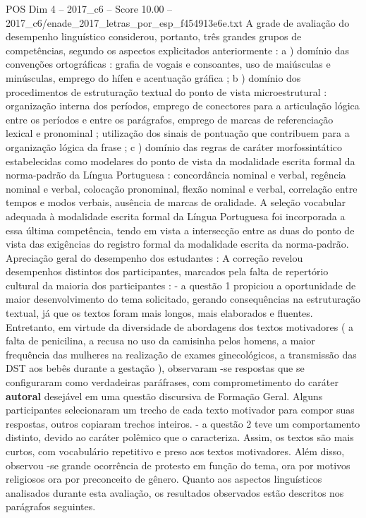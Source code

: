 \begin{textsample}{POS Dim 4 – 2017\_c6 – Score 10.00 – 2017\_c6/enade\_2017\_letras\_por\_esp\_f454913e6e.txt}
A grade de avaliação do desempenho linguístico considerou, portanto, três grandes grupos de competências, segundo os aspectos explicitados anteriormente : a ) domínio das convenções ortográficas : grafia de vogais e consoantes, uso de maiúsculas e minúsculas, emprego do hífen e acentuação gráfica ; b ) domínio dos procedimentos de estruturação textual do ponto de vista microestrutural : organização interna dos períodos, emprego de conectores para a articulação lógica entre os períodos e entre os parágrafos, emprego de marcas de referenciação lexical e pronominal ; utilização dos sinais de pontuação que contribuem para a organização lógica da frase ; c ) domínio das regras de caráter morfossintático estabelecidas como modelares do ponto de vista da modalidade escrita formal da norma-padrão da Língua Portuguesa : concordância nominal e verbal, regência nominal e verbal, colocação pronominal, flexão nominal e verbal, correlação entre tempos e modos verbais, ausência de marcas de oralidade.
A seleção vocabular adequada à modalidade escrita formal da Língua Portuguesa foi incorporada a essa última competência, tendo em vista a intersecção entre as duas do ponto de vista das exigências do registro formal da modalidade escrita da norma-padrão.
Apreciação geral do desempenho dos estudantes : A correção revelou desempenhos distintos dos participantes, marcados pela falta de repertório cultural da maioria dos participantes : - a questão 1 propiciou a oportunidade de maior desenvolvimento do tema solicitado, gerando consequências na estruturação textual, já que os textos foram mais longos, mais elaborados e fluentes.
Entretanto, em virtude da diversidade de abordagens dos textos motivadores ( a falta de penicilina, a recusa no uso da camisinha pelos homens, a maior frequência das mulheres na realização de exames ginecológicos, a transmissão das DST aos bebês durante a gestação ), observaram -se respostas que se configuraram como verdadeiras paráfrases, com comprometimento do caráter \textbf{autoral} desejável em uma questão discursiva de Formação Geral.
Alguns participantes selecionaram um trecho de cada texto motivador para compor suas respostas, outros copiaram trechos inteiros. - a questão 2 teve um comportamento distinto, devido ao caráter polêmico que o caracteriza.
Assim, os textos são mais curtos, com vocabulário repetitivo e preso aos textos motivadores.
Além disso, observou -se grande ocorrência de protesto em função do tema, ora por motivos religiosos ora por preconceito de gênero.
Quanto aos aspectos linguísticos analisados durante esta avaliação, os resultados observados estão descritos nos parágrafos seguintes.

\end{textsample}
